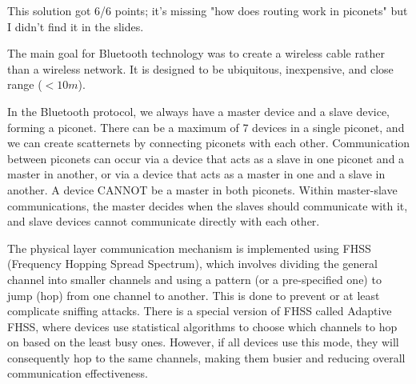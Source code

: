 

\begin{solution}
    This solution got 6/6 points; it's missing "how does routing work in piconets" but I didn't find it in the slides.

    The main goal for Bluetooth technology was to create a wireless cable rather than a wireless network. It is designed to be ubiquitous, inexpensive, and close range ($<10m$).

    In the Bluetooth protocol, we always have a master device and a slave device, forming a piconet. There can be a maximum of 7 devices in a single piconet, and we can create scatternets by connecting piconets with each other. Communication between piconets can occur via a device that acts as a slave in one piconet and a master in another, or via a device that acts as a master in one and a slave in another. A device CANNOT be a master in both piconets. Within master-slave communications, the master decides when the slaves should communicate with it, and slave devices cannot communicate directly with each other.

    The physical layer communication mechanism is implemented using FHSS (Frequency Hopping Spread Spectrum), which involves dividing the general channel into smaller channels and using a pattern (or a pre-specified one) to jump (hop) from one channel to another. This is done to prevent or at least complicate sniffing attacks. There is a special version of FHSS called Adaptive FHSS, where devices use statistical algorithms to choose which channels to hop on based on the least busy ones. However, if all devices use this mode, they will consequently hop to the same channels, making them busier and reducing overall communication effectiveness.


\end{solution}
